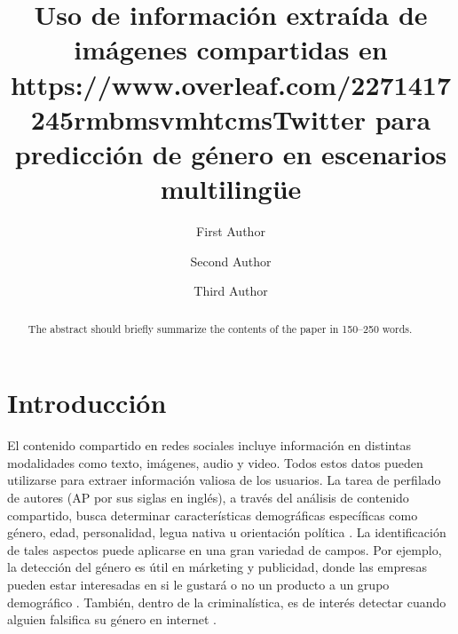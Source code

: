 \documentclass[runningheads]{llncs}
\begin{document}
%
\title{Uso de información extraída de imágenes compartidas en https://www.overleaf.com/2271417245rmbmsvmhtcmsTwitter para predicción de género en escenarios multilingüe}


\author{First Author \and
Second Author \and
Third Author}
%
%

\maketitle

\begin{abstract}
The abstract should briefly summarize the contents of the paper in
150--250 words.

\end{abstract}

\section{Introducción}

El contenido compartido en redes sociales incluye información 
en distintas modalidades como texto, imágenes, audio y video.
Todos estos datos pueden utilizarse para extraer información
valiosa de los usuarios. 
La tarea de perfilado de autores (AP por sus siglas en inglés), a través
del análisis de contenido compartido, busca determinar características demográficas 
específicas como género, edad, personalidad, legua nativa u orientación 
política \cite{rangel_rosso_montes-y-gomez_potthast_stein}. La identificación de tales 
aspectos puede aplicarse en una gran variedad de campos. Por ejemplo, la detección del 
género es útil en márketing y publicidad, donde las empresas pueden estar interesadas
en si le gustará o no un producto a un grupo demográfico \cite{miller_dickinson_hu_2012}.
También, dentro de la criminalística, es de interés detectar cuando alguien falsifica su género en internet \cite{cheng_chandramouli_subbalakshmi_2011}. 
\end{document}
